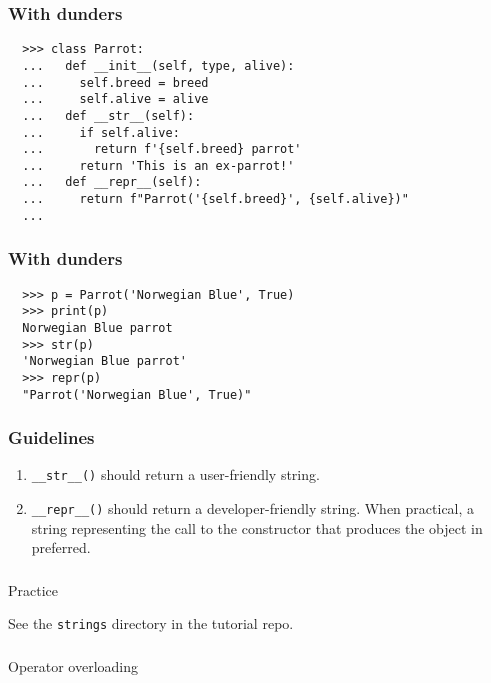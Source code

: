 \documentclass[aspectratio=169]{beamer}
\begin{document}
\begin{frame}[fragile]
  \frametitle{With dunders}
  
  \begin{Verbatim}
  >>> class Parrot:
  ...   def __init__(self, type, alive):
  ...     self.breed = breed
  ...     self.alive = alive
  ...   def __str__(self):
  ...     if self.alive:
  ...       return f'{self.breed} parrot'
  ...     return 'This is an ex-parrot!'
  ...   def __repr__(self):
  ...     return f"Parrot('{self.breed}', {self.alive})"
  ...
    \end{Verbatim}
 \end{frame}
  
  
\begin{frame}[fragile]
  \frametitle{With dunders}
  
  \begin{Verbatim}
  >>> p = Parrot('Norwegian Blue', True)
  >>> print(p)
  Norwegian Blue parrot
  >>> str(p)
  'Norwegian Blue parrot'
  >>> repr(p)
  "Parrot('Norwegian Blue', True)"  
  \end{Verbatim}
 \end{frame}
  
\begin{frame}
  \frametitle{Guidelines} 
  
   
   
   \begin{enumerate}
     \item \texttt{\_\_str\_\_()} should return a user-friendly string.
     \item \texttt{\_\_repr\_\_()} should return a developer-friendly string. When practical, a string representing the call to the constructor that produces the object in preferred.
   \end{enumerate}  
 \end{frame}
  
\begin{frame}
  \frametitle{} 
   
   \centerline{\huge Practice} 
   \centerline{See the \texttt{strings} directory in the tutorial repo.} 
   
   \end{frame}

\begin{frame}
  \frametitle{} 
  \centerline{\huge Operator overloading}
 \end{frame}
 
\end{document}
